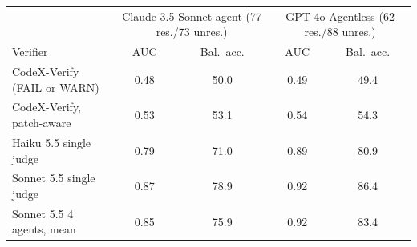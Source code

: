\begin{tabular}{@{}l cccc@{}}
\toprule
 & \multicolumn{2}{c}{Claude 3.5 Sonnet agent (77 res./73 unres.)} & \multicolumn{2}{c}{GPT-4o Agentless (62 res./88 unres.)} \\
Verifier & AUC & Bal.\ acc. & AUC & Bal.\ acc. \\
\midrule
CodeX-Verify (FAIL or WARN) & 0.48 & 50.0 & 0.49 & 49.4 \\
CodeX-Verify, patch-aware & 0.53 & 53.1 & 0.54 & 54.3 \\
Haiku 5.5 single judge & 0.79 & 71.0 & 0.89 & 80.9 \\
Sonnet 5.5 single judge & 0.87 & 78.9 & 0.92 & 86.4 \\
Sonnet 5.5 4 agents, mean & 0.85 & 75.9 & 0.92 & 83.4 \\
\bottomrule
\end{tabular}
